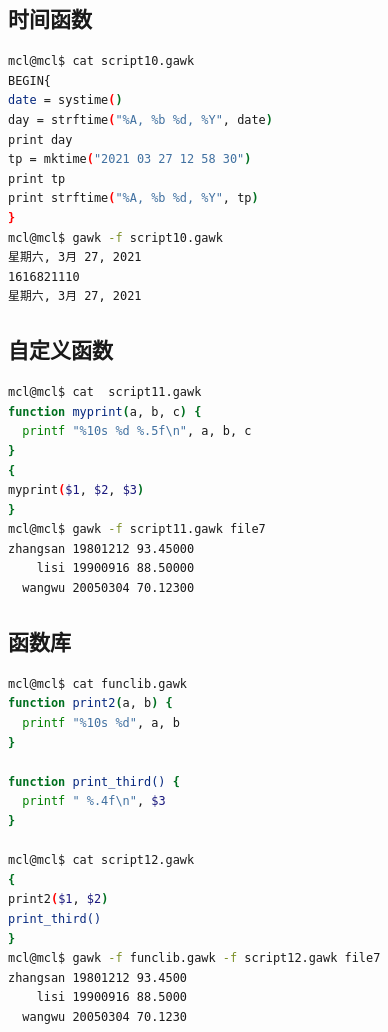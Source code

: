 \documentclass{article}
\begin{document}
\subsection{时间函数}
\begin{lstlisting}[language=bash, caption={7.3}]
mcl@mcl$ cat script10.gawk 
BEGIN{
date = systime()
day = strftime("%A, %b %d, %Y", date)
print day
tp = mktime("2021 03 27 12 58 30")
print tp
print strftime("%A, %b %d, %Y", tp)
}
mcl@mcl$ gawk -f script10.gawk 
星期六, 3月 27, 2021
1616821110
星期六, 3月 27, 2021
\end{lstlisting}
\subsection{自定义函数}
\begin{lstlisting}[language=bash, caption={7.4}]
mcl@mcl$ cat  script11.gawk
function myprint(a, b, c) {
  printf "%10s %d %.5f\n", a, b, c 
}
{
myprint($1, $2, $3)
}
mcl@mcl$ gawk -f script11.gawk file7
zhangsan 19801212 93.45000
    lisi 19900916 88.50000
  wangwu 20050304 70.12300
\end{lstlisting}
\subsection{函数库}
\begin{lstlisting}[language=bash, caption={7.5}]
mcl@mcl$ cat funclib.gawk 
function print2(a, b) {
  printf "%10s %d", a, b
}

function print_third() {
  printf " %.4f\n", $3
}

mcl@mcl$ cat script12.gawk 
{
print2($1, $2)
print_third()
}
mcl@mcl$ gawk -f funclib.gawk -f script12.gawk file7
zhangsan 19801212 93.4500
    lisi 19900916 88.5000
  wangwu 20050304 70.1230
\end{lstlisting}
\end{document}
